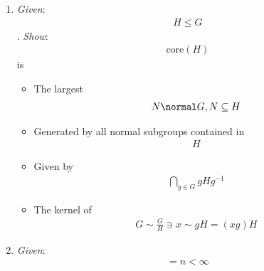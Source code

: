 \begin{enumerate}
\def\labelenumi{\arabic{enumi}.}
\setcounter{enumi}{5}
\item
  \emph{Given}: \begin{align*}H \leq G\end{align*}. \emph{Show}:
  \begin{align*}\text{core}(H)\end{align*} is

  \begin{itemize}
  \tightlist
  \item
    The largest \begin{align*}N \normal G, N \subseteq H\end{align*}
  \item
    Generated by all normal subgroups contained in
    \begin{align*}H\end{align*}
  \item
    Given by \begin{align*}\bigcap_{g\in G} gHg^{-1}\end{align*}
  \item
    The kernel of
    \begin{align*}G \sim \frac{G}{H} \ni x \sim gH = (xg)H\end{align*}
  \end{itemize}
\item
  \emph{Given}: \begin{align*}[H : G]= n < \infty\end{align*}


\end{enumerate}
